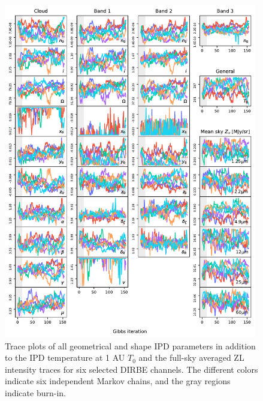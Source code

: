 \documentclass[twocolumn]{aa}
\begin{document}
\begin{figure}
    \centering
    \includegraphics[width=0.985\textwidth]{figs/total_trace.pdf}
    \caption{Trace plots of all geometrical and shape IPD parameters in addition to the IPD temperature at 1 AU $T_0$ and the full-sky averaged ZL intensity traces for six selected DIRBE channels. The different colors indicate six independent Markov chains, and the gray regions indicate burn-in.}
    \label{fig:trace-ipd}
\end{figure}
\end{document}
